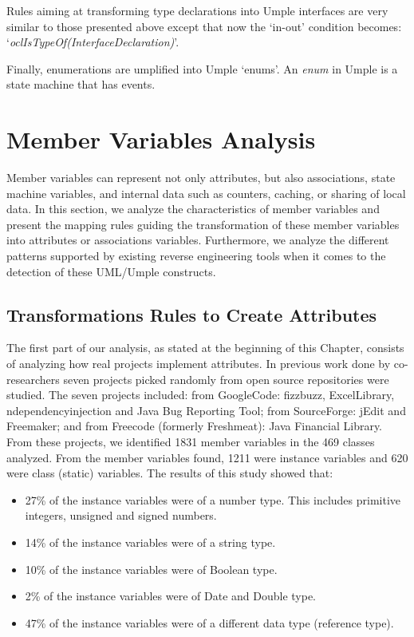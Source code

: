 Rules aiming at transforming type declarations into Umple interfaces are very similar to those presented above except that now the `in-out' condition becomes: 
\newline
`\textit{oclIsTypeOf(InterfaceDeclaration)}'.

Finally, enumerations are umplified into Umple `enums'. An \textit{enum} in Umple is a state machine that has events.

\section{Member Variables Analysis}
Member variables can represent not only attributes, but also associations, state machine variables, and internal data such as counters, caching, or sharing of local data. In this section, we analyze the characteristics of member variables and present the mapping rules guiding the transformation of
these member variables into attributes or associations variables. Furthermore, we analyze the different patterns supported by existing reverse engineering tools when it comes to the detection of these UML/Umple constructs. 

\subsection{Transformations Rules to Create Attributes}
The first part of our analysis, as stated at the beginning of this Chapter, consists of analyzing how real projects implement attributes. In previous work done by co-researchers \cite{UmpleAttributes} seven projects picked randomly from open source repositories were studied. The seven projects included: from GoogleCode: fizzbuzz, ExcelLibrary, ndependencyinjection and Java Bug Reporting Tool; from SourceForge: jEdit and Freemaker; and from Freecode (formerly Freshmeat): Java Financial Library.
From these projects, we identified 1831 member variables in the 469 classes analyzed. From the member variables found, 1211 were instance variables and 620 were class (static) variables. The results of this study showed that:

\begin{itemize}
\item 27\% of the instance variables were of a number type. This includes primitive integers, unsigned and signed numbers.
\item 14\% of the instance variables were of a string type. 
\item 10\% of the instance variables were of Boolean type.
\item 2\% of the instance variables were of Date and Double type.
\item 47\% of the instance variables were of a different data type (reference type).
\end{itemize}

